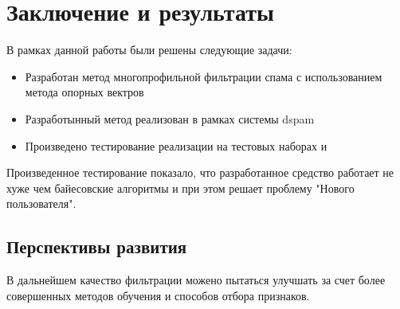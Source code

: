 \newpage
\section{Заключение и результаты}


В рамках данной	работы были решены следующие задачи:
\begin{itemize}
\item Разработан метод многопрофильной фильтрации спама с использованием метода опорных вектров
\item Разработынный метод реализован в рамках системы dspam
\item Произведено тестирование реализации на тестовых наборах \cite{SAPC} и \cite{CEAS}
\end{itemize}

Произведенное тестирование показало, что разработанное средство работает не хуже чем байесовские алгоритмы и при этом решает проблему "Нового пользователя". 

\subsection{Перспективы развития}
В дальнейшем качество фильтрации можено пытаться улучшать за счет более совершенных методов обучения и способов отбора признаков. 


